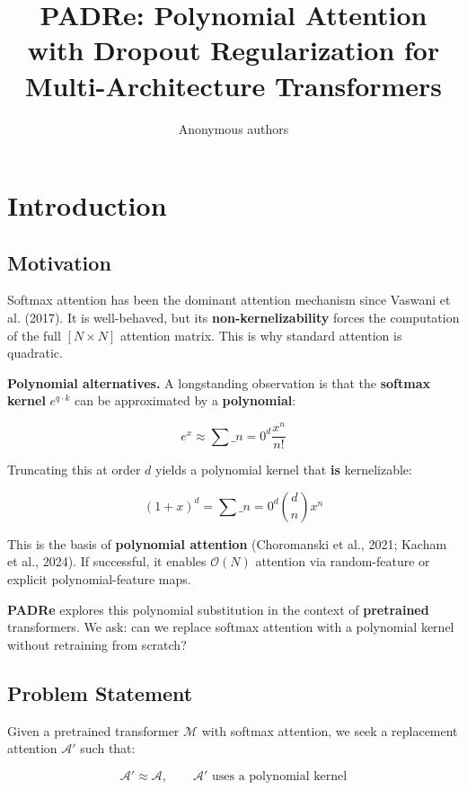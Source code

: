 \title{\textbf{PADRe: Polynomial Attention with Dropout Regularization for Multi-Architecture Transformers}}

\author{Anonymous authors}


\section{Introduction}

\subsection{Motivation}

Softmax attention has been the dominant attention mechanism since 
Vaswani et al. (2017). It is well-behaved, but its \textbf{non-kernelizability} 
forces the computation of the full $[N \times N]$ attention matrix. This 
is why standard attention is quadratic.

\textbf{Polynomial alternatives.} A longstanding observation is that the 
\textbf{softmax kernel} $e^{q \cdot k}$ can be approximated by a \textbf{polynomial}:

\[
e^x \approx \sum\_{n=0}^{d} \frac{x^n}{n!}
\tag{1.1}
\]

Truncating this at order $d$ yields a polynomial kernel that \textbf{is} 
kernelizable:

\[
(1 + x)^d = \sum\_{n=0}^{d} \binom{d}{n} x^n
\tag{1.2}
\]

This is the basis of \textbf{polynomial attention} (Choromanski et al., 2021; 
Kacham et al., 2024). If successful, it enables $\mathcal{O}(N)$ attention 
via random-feature or explicit polynomial-feature maps.

\textbf{PADRe} explores this polynomial substitution in the context of \textbf{pretrained} 
transformers. We ask: can we replace softmax attention with a polynomial 
kernel without retraining from scratch?

\subsection{Problem Statement}

Given a pretrained transformer $\mathcal{M}$ with softmax attention, we 
seek a replacement attention $\mathcal{A}'$ such that:

\[
\mathcal{A}' \approx \mathcal{A}, \qquad
\mathcal{A}' \text{ uses a polynomial kernel}
\tag{1.3}
\]

